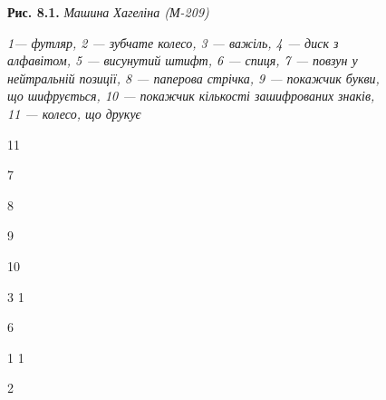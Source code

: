 \begin{figure}
\centering
\begin{minipage}{5.8043in}
{\centering
\textbf{Рис. 8.1.}\textit{ Машина Хагеліна (М-209)}
\par}


\bigskip

{\centering\itshape
1--- футляр, 2 --- зубчате колесо, 3 --- важіль, 4 --- диск з алфавітом,  5 --- висунутий
штифт, 6 ---  спиця, 7 --- повзун у нейтральній позиції, 8 --- паперова стрічка, 9 ---
покажчик букви, що шифрується, 10 --- покажчик кількості зашифрованих знаків, 11
---  колесо, що друкує
\par}


\bigskip
\end{minipage}
\end{figure}
\begin{figure}
\centering
\begin{minipage}{0.4043in}
11
\end{minipage}
\end{figure}
\begin{figure}
\centering
\begin{minipage}{0.4126in}
 7


\bigskip

 8


\bigskip


\bigskip

 9


\bigskip

 10


\bigskip


\bigskip
\end{minipage}
\end{figure}
\begin{figure}
\centering
\begin{minipage}{0.2835in}
3  1
\end{minipage}
\end{figure}
\begin{figure}
\centering
\begin{minipage}{0.2209in}
6
\end{minipage}
\end{figure}
\begin{figure}
\centering
\begin{minipage}{0.3335in}
1  1
\end{minipage}
\end{figure}
\begin{figure}
\centering
\begin{minipage}{0.1252in}
2
\end{minipage}
\end{figure}
